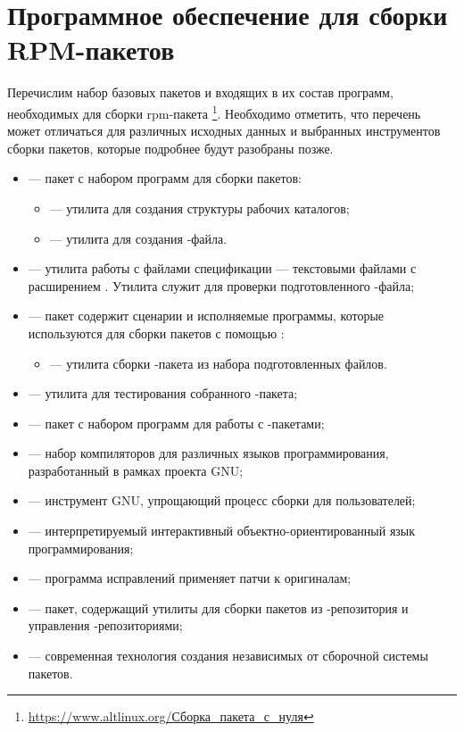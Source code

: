\section{Программное обеспечение для сборки RPM-пакетов}

Перечислим набор базовых пакетов и входящих в их состав программ, необходимых для
сборки rpm-пакета%
\footnote{\href{https://www.altlinux.org/\%D0\%A1\%D0\%B1\%D0\%BE\%D1\%80\%D0\%BA\%D0\%B0_\%D0\%BF\%D0\%B0\%D0\%BA\%D0\%B5\%D1\%82\%D0\%B0_\%D1\%81_\%D0\%BD\%D1\%83\%D0\%BB\%D1\%8F}%
{https://www.altlinux.org/Сборка\_пакета\_с\_нуля}}.
Необходимо отметить, что перечень может отличаться для различных исходных данных
и выбранных инструментов сборки пакетов, которые подробнее будут разобраны позже.

\begin{itemize}
	\item {} --- пакет с набором программ для сборки пакетов:
	\begin{itemize}
		\item {} --- утилита для создания структуры рабочих каталогов;
		\item {} --- утилита для создания -файла.
	\end{itemize}
	\item {} --- утилита работы с файлами спецификации --- текстовыми файлами с расширением
		. Утилита служит для проверки подготовленного -файла;
	\item {} --- пакет содержит сценарии и исполняемые программы, которые используются для сборки пакетов с помощью :
	\begin{itemize}
		\item {} --- утилита сборки -пакета из набора подготовленных файлов.
	\end{itemize}
	\item {} --- утилита для тестирования собранного -пакета;
	\item {} --- пакет с набором программ для работы с -пакетами;
	\item {} --- набор компиляторов для различных языков программирования, разработанный в рамках проекта GNU;
	\item {} --- инструмент GNU, упрощающий процесс сборки для пользователей;
	\item {} --- интерпретируемый интерактивный объектно-ориентированный язык программирования;
	\item {} --- программа исправлений применяет патчи к оригиналам;
	\item {} --- пакет, содержащий утилиты для сборки пакетов  из -репозитория и управления -репозиториями;
	\item {} --- современная технология создания независимых от сборочной системы пакетов.
\end{itemize}

